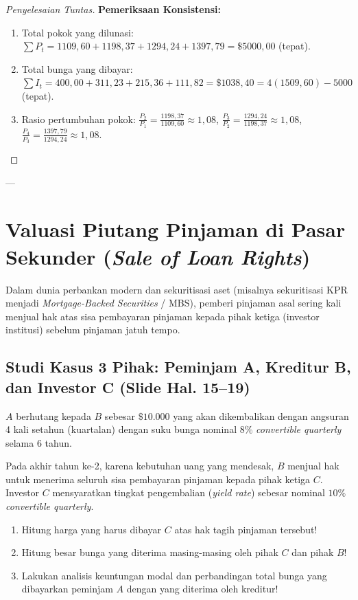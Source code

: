 \documentclass[11pt,a4paper]{article}
\begin{document}
\begin{proof}[Penyelesaian Tuntas]
\noindent\textbf{Pemeriksaan Konsistensi:}
\begin{enumerate}
    \item Total pokok yang dilunasi: $\sum P_t = 1109{,}60 + 1198{,}37 + 1294{,}24 + 1397{,}79 = \$5000{,}00$ (tepat).
    \item Total bunga yang dibayar: $\sum I_t = 400{,}00 + 311{,}23 + 215{,}36 + 111{,}82 = \$1038{,}40 = 4(1509{,}60) - 5000$ (tepat).
    \item Rasio pertumbuhan pokok: $\frac{P_2}{P_1} = \frac{1198{,}37}{1109{,}60} \approx 1{,}08$, $\frac{P_3}{P_2} = \frac{1294{,}24}{1198{,}37} \approx 1{,}08$, $\frac{P_4}{P_3} = \frac{1397{,}79}{1294{,}24} \approx 1{,}08$.
\end{enumerate}
\end{proof}

---

\section{Valuasi Piutang Pinjaman di Pasar Sekunder (\textit{Sale of Loan Rights})}

Dalam dunia perbankan modern dan sekuritisasi aset (misalnya sekuritisasi KPR menjadi \textit{Mortgage-Backed Securities} / MBS), pemberi pinjaman asal sering kali menjual hak atas sisa pembayaran pinjaman kepada pihak ketiga (investor institusi) sebelum pinjaman jatuh tempo.

\subsection{Studi Kasus 3 Pihak: Peminjam A, Kreditur B, dan Investor C (Slide Hal. 15--19)}

\begin{examplebox}
$A$ berhutang kepada $B$ sebesar $\$10.000$ yang akan dikembalikan dengan angsuran 4 kali setahun (kuartalan) dengan suku bunga nominal $8\%$ \textit{convertible quarterly} selama 6 tahun.

Pada akhir tahun ke-2, karena kebutuhan uang yang mendesak, $B$ menjual hak untuk menerima seluruh sisa pembayaran pinjaman kepada pihak ketiga $C$. Investor $C$ mensyaratkan tingkat pengembalian (\textit{yield rate}) sebesar nominal $10\%$ \textit{convertible quarterly}.
\begin{enumerate}[label=(\alph*)]
    \item Hitung harga yang harus dibayar $C$ atas hak tagih pinjaman tersebut!
    \item Hitung besar bunga yang diterima masing-masing oleh pihak $C$ dan pihak $B$!
    \item Lakukan analisis keuntungan modal dan perbandingan total bunga yang dibayarkan peminjam $A$ dengan yang diterima oleh kreditur!
\end{enumerate}
\end{examplebox}
\end{document}
